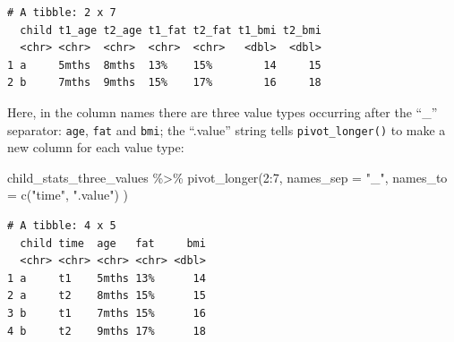 \documentclass[
  letterpaper,
  DIV=11,
  numbers=noendperiod]{scrreprt}
\newenvironment{Shaded}{\begin{snugshade}}{\end{snugshade}}
\newcommand{\AttributeTok}[1]{\textcolor[rgb]{0.40,0.45,0.13}{#1}}
\newcommand{\DecValTok}[1]{\textcolor[rgb]{0.68,0.00,0.00}{#1}}
\newcommand{\FunctionTok}[1]{\textcolor[rgb]{0.28,0.35,0.67}{#1}}
\newcommand{\NormalTok}[1]{\textcolor[rgb]{0.00,0.23,0.31}{#1}}
\newcommand{\SpecialCharTok}[1]{\textcolor[rgb]{0.37,0.37,0.37}{#1}}
\newcommand{\StringTok}[1]{\textcolor[rgb]{0.13,0.47,0.30}{#1}}
\begin{document}
\begin{verbatim}
# A tibble: 2 x 7
  child t1_age t2_age t1_fat t2_fat t1_bmi t2_bmi
  <chr> <chr>  <chr>  <chr>  <chr>   <dbl>  <dbl>
1 a     5mths  8mths  13%    15%        14     15
2 b     7mths  9mths  15%    17%        16     18
\end{verbatim}

Here, in the column names there are three value types occurring after
the ``\_'' separator: \texttt{age}, \texttt{fat} and \texttt{bmi}; the
``.value'' string tells \texttt{pivot\_longer()} to make a new column
for each value type:

\begin{Shaded}
\begin{Highlighting}[]
\NormalTok{child\_stats\_three\_values }\SpecialCharTok{\%\textgreater{}\%} 
  \FunctionTok{pivot\_longer}\NormalTok{(}\DecValTok{2}\SpecialCharTok{:}\DecValTok{7}\NormalTok{, }
               \AttributeTok{names\_sep =} \StringTok{"\_"}\NormalTok{,}
               \AttributeTok{names\_to =} \FunctionTok{c}\NormalTok{(}\StringTok{"time"}\NormalTok{, }\StringTok{".value"}\NormalTok{)}
\NormalTok{               )}
\end{Highlighting}
\end{Shaded}

\begin{verbatim}
# A tibble: 4 x 5
  child time  age   fat     bmi
  <chr> <chr> <chr> <chr> <dbl>
1 a     t1    5mths 13%      14
2 a     t2    8mths 15%      15
3 b     t1    7mths 15%      16
4 b     t2    9mths 17%      18
\end{verbatim}
\end{document}
